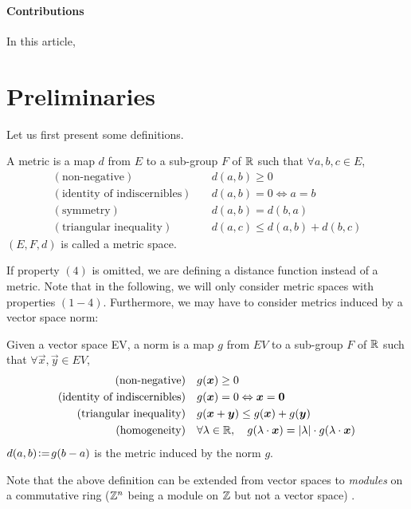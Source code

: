 \documentclass{llncs}
\begin{document}
\paragraph{Contributions} In this article,

\section{Preliminaries}
\label{sec:preliminaries}

Let us first present some definitions.
\begin{definition}
  \label{def:distance}
  A metric is a map $d$ from $E$ to a sub-group $F$ of ${\mathbb{R}}$ such that
  $\forall a,b,c\in E$,
  \begin{align}
    (\text{non-negative})\quad & d(a,b)\geq 0\\
    (\text{identity of indiscernibles}) \quad&  d(a,b)= 0
    \Leftrightarrow a=b\\
    (\text{symmetry})\quad &  d(a,b)=d(b,a)\\
    (\text{triangular inequality})\quad &   d(a,c) \leq d(a,b) + d(b,c)
  \end{align}
$(E, F, d)$ is called a metric space.
\end{definition}
If property $(4)$ is omitted, we are defining a distance function
instead of a metric. Note that in the following, we will only consider
metric spaces with properties $(1-4)$. Furthermore, we may have to
consider  metrics induced by a vector space norm:
\begin{definition}
  \label{def:distance}
  Given a vector space EV, a norm is a map $g$ from  $EV$ to a sub-group
  $F$ of ${\mathbb{R}}$ such that $\forall \vec{x},\vec{y}\in EV$,
  \begin{align}
    (\text{non-negative})\quad & g(\vec{x})\geq 0\\
    (\text{identity of indiscernibles}) \quad&  g(\vec{x})= 0
    \Leftrightarrow \vec{x}=\vec{0}\\
    (\text{triangular inequality})\quad &   g(\vec{x}+\vec{y}) \leq
    g(\vec{x}) + g(\vec{y})\\
    (\text{homogeneity})\quad &  \forall \lambda\in\R, \quad
    g(\lambda\cdot\vec{x}) = |\lambda|\cdot g(\lambda\cdot\vec{x})
  \end{align}
$d(a,b) \!\mathrel{\mathop:}=\! g(b-a)$ is the metric induced by the
  norm $g$.
\end{definition}
Note that the above definition can be extended from vector spaces to
\emph{modules} on a commutative ring (${\mathbb{Z}}^n$ being a module on ${\mathbb{Z}}$
but not a vector space) \cite{Thiel_hdr}.
\end{document}
